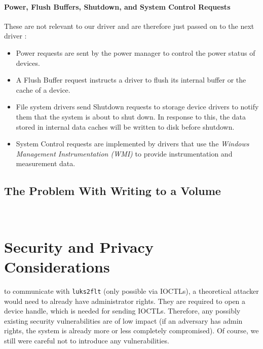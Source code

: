 \paragraph{Power, Flush Buffers, Shutdown, and System Control Requests} These are not relevant to our driver and are therefore just passed on to the next driver \cite{Kerneldriver}:
\begin{itemize}
	\item Power requests are sent by the power manager to control the power status of devices.
	\item A Flush Buffer request instructs a driver to flush its internal buffer or the cache of a device.
	\item File system drivers send Shutdown requests to storage device drivers to notify them that the system is about to shut down. In response to this, the data stored in internal data caches will be written to disk before shutdown.
	\item System Control requests are implemented by drivers that use the \emph{Windows Management Instrumentation (WMI)} to provide instrumentation and measurement data.
\end{itemize}

\subsection{The Problem With Writing to a Volume}
\label{chap:ourapproach.final.writeproblem}
\\


\section{Security and Privacy Considerations}
\label{chap:ourapproach.security}

 to communicate with \texttt{luks2flt} (only possible via IOCTLs), a theoretical attacker would need to already have administrator rights. They are required to open a device handle, which is needed for sending IOCTLs. Therefore, any possibly existing security vulnerabilities are of low impact (if an adversary has admin rights, the system is already more or less completely compromised). Of course, we still were careful not to introduce any vulnerabilities.

